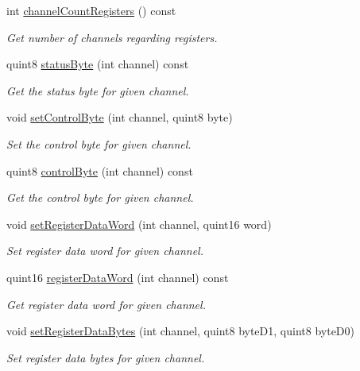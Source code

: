 \begin{DoxyCompactItemize}
int \hyperlink{classmdt_device_modbus_wago_module_a335047318b1be765a12002bdbd04988b}{channel\-Count\-Registers} () const 
\begin{DoxyCompactList}\small\item\em Get number of channels regarding registers. \end{DoxyCompactList}\item 
quint8 \hyperlink{classmdt_device_modbus_wago_module_abe92a4c761a0ccf4d31312eda0521b11}{status\-Byte} (int channel) const 
\begin{DoxyCompactList}\small\item\em Get the status byte for given channel. \end{DoxyCompactList}\item 
void \hyperlink{classmdt_device_modbus_wago_module_aba44d9749bb81fe2659699ae3c50842c}{set\-Control\-Byte} (int channel, quint8 byte)
\begin{DoxyCompactList}\small\item\em Set the control byte for given channel. \end{DoxyCompactList}\item 
quint8 \hyperlink{classmdt_device_modbus_wago_module_a668b35f8174b6a04cb703ef0e9b56128}{control\-Byte} (int channel) const 
\begin{DoxyCompactList}\small\item\em Get the control byte for given channel. \end{DoxyCompactList}\item 
void \hyperlink{classmdt_device_modbus_wago_module_a614e6c3b3b0e832202eb0a1082f53b0a}{set\-Register\-Data\-Word} (int channel, quint16 word)
\begin{DoxyCompactList}\small\item\em Set register data word for given channel. \end{DoxyCompactList}\item 
quint16 \hyperlink{classmdt_device_modbus_wago_module_a0f0ce9200c967775834b05649f8e499d}{register\-Data\-Word} (int channel) const 
\begin{DoxyCompactList}\small\item\em Get register data word for given channel. \end{DoxyCompactList}\item 
void \hyperlink{classmdt_device_modbus_wago_module_ab1b83fbb869c62c46e21cdac54ff9458}{set\-Register\-Data\-Bytes} (int channel, quint8 byte\-D1, quint8 byte\-D0)
\begin{DoxyCompactList}\small\item\em Set register data bytes for given channel. \end{DoxyCompactList}\item 

\end{DoxyCompactItemize}
